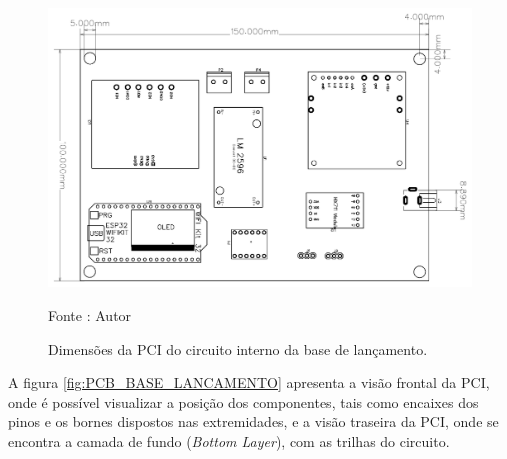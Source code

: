 \begin{figure}[H]
  \centering
  \includegraphics[width=\textwidth]{figuras/PDFs/final eletronica/PCB_BASE_FINAL.png}
  \caption{ Dimensões da PCI do circuito interno da base de lançamento. } 
  {\footnotesize Fonte : Autor } 
  \label{fig:PCB_BASE_LANCAMENTO_DES}
\end{figure}

A figura \ref{fig:PCB_BASE_LANCAMENTO} apresenta a visão frontal da PCI, onde é possível visualizar a posição dos componentes, tais como encaixes dos pinos e os bornes dispostos nas extremidades, e a visão traseira da PCI, onde se encontra a camada de fundo (\textit{Bottom Layer}), com as trilhas do circuito.

